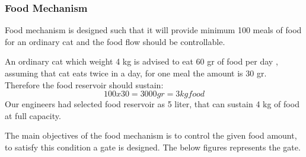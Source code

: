 \subsubsection{Food Mechanism}
Food mechanism is designed such that it will provide minimum 100 meals of food for an ordinary cat and the food flow should be controllable. 

An ordinary cat which weight 4 kg is advised to eat 60 gr of food per day \cite{cite:catfood}, assuming that cat eats twice in a day, for one meal the amount is 30 gr. Therefore the food reservoir should sustain:
\begin{equation}
    100 x 30 = 3000gr=3kg food 
\end{equation} 
Our engineers had selected food reservoir as 5 liter, that can sustain 4 kg of food at full capacity. 

The main objectives of the food mechanism is to control the given food amount, to satisfy this condition a gate is designed. The below figures represents the gate.

